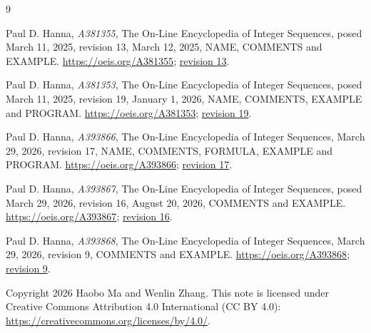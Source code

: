 \documentclass[11pt]{article}
\begin{document}
\small
\begin{thebibliography}{9}
\raggedright
{}
Paul D. Hanna, \emph{A381355}, The On-Line Encyclopedia of Integer
Sequences, posed March 11, 2025, revision 13, March 12, 2025,
NAME, COMMENTS and EXAMPLE.
\url{https://oeis.org/A381355};
\href{https://oeis.org/history/view?seq=A381355&v=13}{revision 13}.

Paul D. Hanna, \emph{A381353}, The On-Line Encyclopedia of Integer
Sequences, posed March 11, 2025, revision 19, January 1, 2026,
NAME, COMMENTS, EXAMPLE and PROGRAM.
\url{https://oeis.org/A381353};
\href{https://oeis.org/history/view?seq=A381353&v=19}{revision 19}.

Paul D. Hanna, \emph{A393866}, The On-Line Encyclopedia of Integer
Sequences, March 29, 2026, revision 17, NAME, COMMENTS, FORMULA,
EXAMPLE and PROGRAM. \url{https://oeis.org/A393866};
\href{https://oeis.org/history/view?seq=A393866&v=17}{revision 17}.

Paul D. Hanna, \emph{A393867}, The On-Line Encyclopedia of Integer
Sequences, posed March 29, 2026, revision 16, August 20, 2026,
COMMENTS and EXAMPLE. \url{https://oeis.org/A393867};
\href{https://oeis.org/history/view?seq=A393867&v=16}{revision 16}.

Paul D. Hanna, \emph{A393868}, The On-Line Encyclopedia of Integer
Sequences, March 29, 2026, revision 9, COMMENTS and EXAMPLE.
\url{https://oeis.org/A393868};
\href{https://oeis.org/history/view?seq=A393868&v=9}{revision 9}.

\end{thebibliography}

\noindent\small Copyright 2026 Haobo Ma and Wenlin Zhang.
This note is licensed under Creative Commons Attribution 4.0 International
(CC BY 4.0): \url{https://creativecommons.org/licenses/by/4.0/}.
\end{document}

